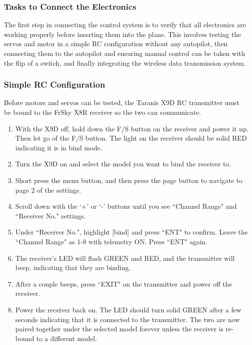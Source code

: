 \documentclass[12pt,journal,compsoc]{IEEEtran}
\begin{document}
\subsubsection{Tasks to Connect the Electronics}
The first step in connecting the control system is to verify that all electronics are working properly before inserting them into the plane. This involves testing the servos and motor in a simple RC configuration without any autopilot, then connecting them to the autopilot and ensuring manual control can be taken with the flip of a switch, and finally integrating the wireless data transmission system.
\subsubsection{Simple RC Configuration}
Before motors and servos can be tested, the Taranis X9D RC transmitter must be bound to the FrSky X8R receiver so the two can communicate.
\begin{enumerate}
\item With the X9D off, hold down the F/S button on the receiver and power it up. Then let go of the F/S button. The light on the receiver should be solid RED indicating it is in bind mode.
\item Turn the X9D on and select the model you want to bind the receiver to.
\item Short press the menu button, and then press the page button to navigate to page 2 of the settings.
\item Scroll down with the `+' or `-' buttons until you see ``Channel Range" and ``Receiver No." settings.
\item Under ``Receiver No.", highlight [bind] and press ``ENT" to confirm. Leave the ``Channel Range" as 1-8 with telemetry ON. Press ``ENT" again.
\item The receiver's LED will flash GREEN and RED, and the transmitter will beep, indicating that they are binding.
\item After a couple beeps, press ``EXIT" on the transmitter and power off the receiver.
\item Power the receiver back on. The LED should turn solid GREEN after a few seconds indicating that it is connected to the transmitter. The two are now paired together under the selected model forever unless the receiver is re-bound to a different model.
\end{enumerate}
\end{document}
